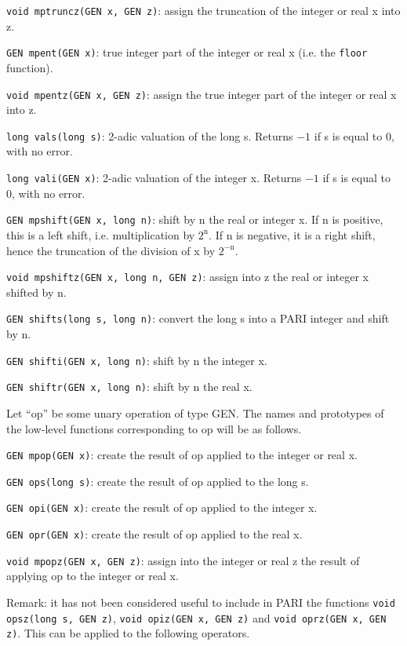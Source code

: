 {\tt void mptruncz(GEN x, GEN z)}: assign the truncation of the integer or
real x into z. 

{\tt GEN mpent(GEN x)}: true integer part of the integer or real x (i.e. the
{\tt floor} function).

{\tt void mpentz(GEN x, GEN z)}: assign the true integer part of the integer
or real x into z.


{\tt long vals(long s)}: 2-adic valuation of the long s. Returns $-1$ if
s is equal to 0, with no error.

{\tt long vali(GEN x)}: 2-adic valuation of the integer x. Returns $-1$ if
s is equal to 0, with no error.

{\tt GEN mpshift(GEN x, long n)}: shift by n the real or integer x. If n is
positive, this is a left shift, i.e. multiplication by $2^{\text{n}}$. If
n is negative, it is a right shift, hence the truncation of the division of x
by $2^{-\text{n}}$.

{\tt void mpshiftz(GEN x, long n, GEN z)}: assign into z the real or integer x
shifted by n.

{\tt GEN shifts(long s, long n)}: convert the long s into a PARI integer and
shift by n.

{\tt GEN shifti(GEN x, long n)}: shift by n the integer x.

{\tt GEN shiftr(GEN x, long n)}: shift by n the real x.


Let ``op'' be some unary operation of type GEN. The names and prototypes of
the low-level functions corresponding to op will be as follows.

{\tt GEN mpop(GEN x)}: create the result of op applied to the integer or real
x.

{\tt GEN ops(long s)}: create the result of op applied to the long s.

{\tt GEN opi(GEN x)}: create the result of op applied to the integer x.

{\tt GEN opr(GEN x)}: create the result of op applied to the real x.

{\tt void mpopz(GEN x, GEN z)}: assign into the integer or real z the result
of applying op to the integer or real x.

Remark: it has not been considered useful to include in PARI the functions
{\tt void opsz(long s, GEN z)}, {\tt void opiz(GEN x, GEN z)} and 
{\tt void oprz(GEN x, GEN z)}.
\smallskip
This can be applied to the following operators.

